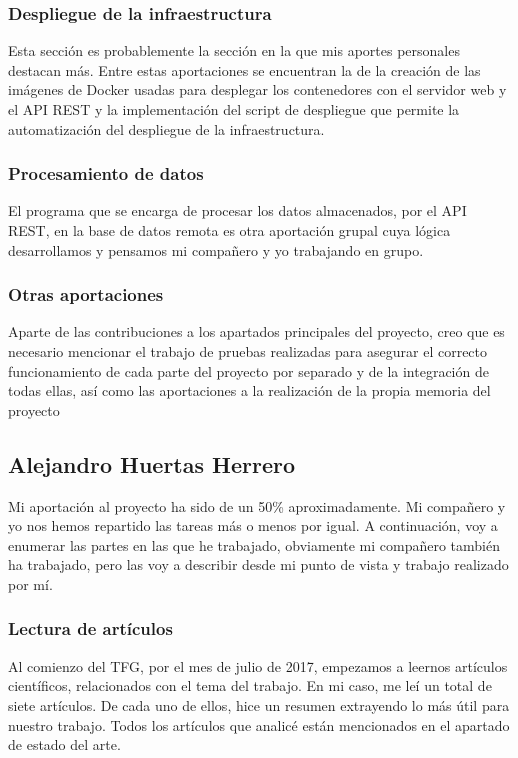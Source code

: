 \documentclass[11pt,spanish]{article}
\begin{document}
\subsubsection{Despliegue de la infraestructura}
Esta sección es probablemente la sección en la que mis aportes personales destacan más. Entre estas aportaciones se encuentran la de la creación de las imágenes de Docker usadas para desplegar los contenedores con el servidor web y el API REST y la implementación del script de despliegue que permite la automatización del despliegue de la infraestructura.

\subsubsection{Procesamiento de datos}
El programa que se encarga de procesar los datos almacenados, por el API REST, en la base de datos remota es otra aportación grupal cuya lógica desarrollamos y pensamos mi compañero y yo trabajando en grupo.

\subsubsection{Otras aportaciones}
Aparte de las contribuciones a los apartados principales del proyecto, creo que es necesario mencionar el trabajo de pruebas realizadas para asegurar el correcto funcionamiento de cada parte del proyecto por separado y de la integración de todas ellas, así como las aportaciones a la realización de la propia memoria del proyecto

\subsection{Alejandro Huertas Herrero}
Mi aportación al proyecto ha sido de un 50\% aproximadamente. Mi compañero y yo nos hemos repartido las tareas más o menos por igual. A continuación, voy a enumerar las partes en las que he trabajado, obviamente mi compañero también ha trabajado, pero las voy a describir desde mi punto de vista y trabajo realizado por mí.

\subsubsection{Lectura de artículos }
Al comienzo del TFG, por el mes de julio de 2017, empezamos a leernos artículos científicos, relacionados con el tema del trabajo. En mi caso, me leí un total de siete artículos. De cada uno de ellos, hice un resumen extrayendo lo más útil para nuestro trabajo. Todos los artículos que analicé están mencionados en el apartado de estado del arte.
\end{document}
